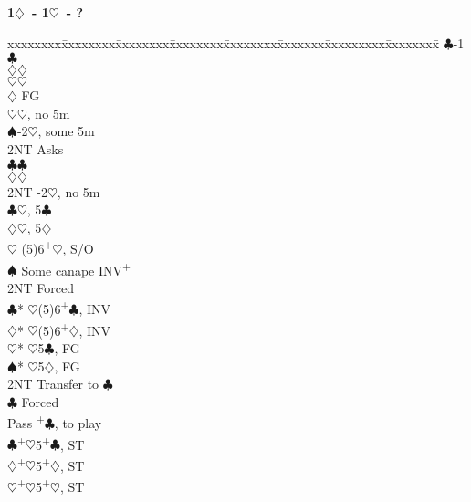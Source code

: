 \documentclass[10pt]{article}
\renewcommand{\c}{$\clubsuit$}
\renewcommand{\d}{$\diamondsuit$}
\newcommand{\h}{$\heartsuit$}
\newcommand{\s}{$\spadesuit$}
\newcommand{\p}{\textsuperscript{+}}
\newenvironment{bidtable}[1][]
{\textbf{#1}
  \begin{adjustwidth}{1em}{}
    \addvspace{2pt}
    \begin{tabbing}
      xxxxxxxx\=xxxxxxxx\=xxxxxxxx\=xxxxxxxx\=xxxxxxxx\=xxxxxxx\=xxxxxxxxx\=xxxxxxxx\=\kill}
{\end{tabbing}\end{adjustwidth}\bigskip}%
\begin{document}
\begin{bidtable}[1\d\ - 1\h\ - ?]
     \>      \>     \c  {}-1\c                            \\
     \>      \>     \d  {}\d                              \\
     \>      \>     \h  {}\h                              \\
     \d  \> FG                                              \\
     \>      \h {}\h, no 5m                               \\
     \>      \s {}-2\h, some 5m                           \\
     \>      \>     \> 2NT  \> Asks                             \\
     \>      \>     \>      \c   {}\c                     \\
     \>      \>     \>      \d   {}\d                     \\
     \>      \> 2NT -2\h, no 5m                             \\
     \>      \c {}\h, 5\c                                 \\
     \>      \d {}\h, 5\d                                 \\
     \h  \> (5)6\p\h, S/O                                   \\
     \s  \> Some canape INV\p                               \\
     \>      \> 2NT \> Forced                                   \\
     \>      \>     \c* {}\h (5)6\p\c, INV                \\
     \>      \>     \d* {}\h (5)6\p\d, INV                \\
     \>      \>     \h* {}\h 5\c, FG                      \\
     \>      \>     \s* {}\h 5\d, FG                      \\
     \> 2NT  \> Transfer to \c                                  \\
     \>      \c \> Forced                                   \\
     \>      \>     \> Pass \p\c, to play                   \\
     \c  {}\p\h 5\p\c, ST                                 \\
     \d  {}\p\h 5\p\d, ST                                 \\
     \h  {}\p\h 5\p\h, ST                                 \\

\end{bidtable}
\end{document}
